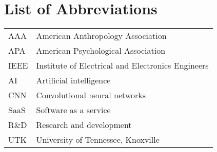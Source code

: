 \chapter*{List of Abbreviations} \label{abbreviations}

\begin{tabular}{@{}L{1in} L{4.5in}}
AAA & American Anthropology Association \\
APA & American Psychological Association \\
IEEE & Institute of Electrical and Electronics Engineers \\
AI & Artificial intelligence \\
CNN & Convolutional neural networks \\
SaaS & Software as a service \\
R\&D & Research and development \\
UTK & University of Tennessee, Knoxville \\
\end{tabular}

